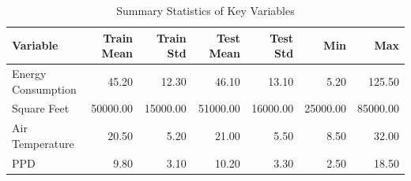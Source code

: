 \begin{table}
\centering
\caption{Summary Statistics of Key Variables}
\label{tab:summary_stats}
\begin{tabular}{lrrrrrr}
\toprule
Variable & Train Mean & Train Std & Test Mean & Test Std & Min & Max \\
\midrule
Energy Consumption & 45.20 & 12.30 & 46.10 & 13.10 & 5.20 & 125.50 \\
Square Feet & 50000.00 & 15000.00 & 51000.00 & 16000.00 & 25000.00 & 85000.00 \\
Air Temperature & 20.50 & 5.20 & 21.00 & 5.50 & 8.50 & 32.00 \\
PPD & 9.80 & 3.10 & 10.20 & 3.30 & 2.50 & 18.50 \\
\bottomrule
\end{tabular}
\end{table}

